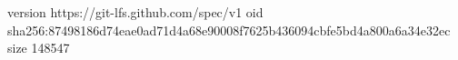 version https://git-lfs.github.com/spec/v1
oid sha256:87498186d74eae0ad71d4a68e90008f7625b436094cbfe5bd4a800a6a34e32ec
size 148547
